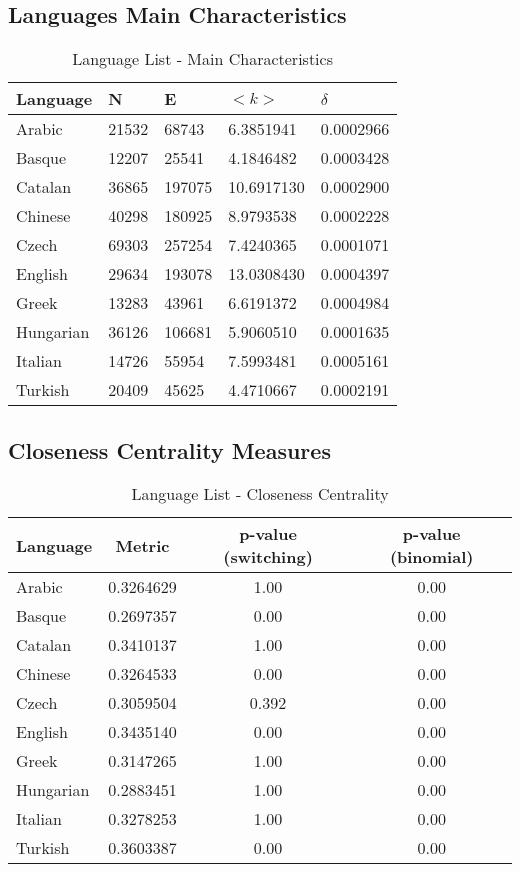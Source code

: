 \documentclass[12pt, a4paper]{article}
\begin{document}
\subsection{Languages Main Characteristics}

\begin{table}[H]
    \centering
    \begin{tabular}{l l l l l}
    Language & N & E & $<k>$ & $\delta$ \\
     \hline
     Arabic & 21532 & 68743 & 6.3851941 & 0.0002966 \\ 
     Basque & 12207 & 25541 & 4.1846482 & 0.0003428 \\ 
     Catalan & 36865 & 197075 & 10.6917130 & 0.0002900 \\ 
     Chinese & 40298 & 180925 & 8.9793538 & 0.0002228 \\ 
     Czech & 69303 & 257254 & 7.4240365 & 0.0001071 \\ 
     English & 29634 & 193078 & 13.0308430 & 0.0004397 \\ 
     Greek & 13283 & 43961 & 6.6191372 & 0.0004984 \\ 
     Hungarian & 36126 & 106681 & 5.9060510 & 0.0001635 \\ 
     Italian & 14726 & 55954 & 7.5993481 & 0.0005161 \\ 
     Turkish & 20409 & 45625 & 4.4710667 & 0.0002191
    \end{tabular}
   \caption{Language List - Main Characteristics}
   \label{table:1}
\end{table}

\subsection{Closeness Centrality Measures}

\begin{table}[H]
  \centering
  \begin{tabular}{l c c c}
  Language & Metric & p-value (switching) & p-value (binomial)\\
   \hline
   Arabic & 0.3264629  & 1.00 & 0.00 \\
   Basque & 0.2697357  & 0.00 & 0.00 \\
   Catalan & 0.3410137 & 1.00 & 0.00 \\
   Chinese & 0.3264533 & 0.00 & 0.00 \\
   Czech & 0.3059504 & 0.392 & 0.00 \\
   English & 0.3435140  & 0.00 & 0.00 \\
   Greek & 0.3147265  & 1.00 & 0.00 \\
   Hungarian & 0.2883451 & 1.00 & 0.00 \\
   Italian & 0.3278253 & 1.00 & 0.00 \\
   Turkish & 0.3603387  & 0.00 & 0.00 \\
     \end{tabular}
 \caption{Language List - Closeness Centrality}
 \label{table:2}
\end{table}
\end{document}
